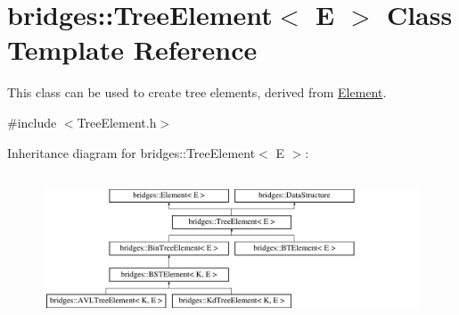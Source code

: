 \hypertarget{classbridges_1_1_tree_element}{}\section{bridges\+:\+:Tree\+Element$<$ E $>$ Class Template Reference}
\label{classbridges_1_1_tree_element}


This class can be used to create tree elements, derived from \hyperlink{classbridges_1_1_element}{Element}.  




{\ttfamily \#include $<$Tree\+Element.\+h$>$}

Inheritance diagram for bridges\+:\+:Tree\+Element$<$ E $>$\+:\begin{figure}[H]
\begin{center}
\leavevmode
\includegraphics[height=4.402516cm]{classbridges_1_1_tree_element}
\end{center}
\end{figure}
